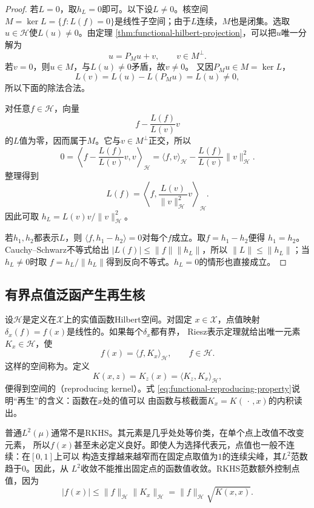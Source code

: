 \begin{proof}
若$L=0$，取$h_L=0$即可。以下设$L\neq0$。核空间
$M=\ker L=\{f:L(f)=0\}$是线性子空间；由于$L$连续，$M$也是闭集。选取
$u\in\mathcal{H}$使$L(u)\neq0$。由定理
\ref{thm:functional-hilbert-projection}，可以把$u$唯一分解为
\[
  u=P_Mu+v,\qquad v\in M^\perp.
\]
若$v=0$，则$u\in M$，与$L(u)\neq0$矛盾，故$v\neq0$。
又因$P_Mu\in M=\ker L$，
\[
  L(v)=L(u)-L(P_Mu)=L(u)\neq0,
\]
所以下面的除法合法。

对任意$f\in\mathcal{H}$，向量
\[
  f-\frac{L(f)}{L(v)}v
\]
的$L$值为零，因而属于$M$。它与$v\in M^\perp$正交，所以
\[
  0
  =
  \left\langle
    f-\frac{L(f)}{L(v)}v,v
  \right\rangle_{\mathcal{H}}
  =
  \langle f,v\rangle_{\mathcal{H}}
  -
  \frac{L(f)}{L(v)}\lVert v\rVert_{\mathcal{H}}^2.
\]
整理得到
\[
  L(f)
  =
  \left\langle
    f,\frac{L(v)}{\lVert v\rVert_{\mathcal{H}}^2}v
  \right\rangle_{\mathcal{H}}.
\]
因此可取
$h_L=L(v)v/\lVert v\rVert_{\mathcal{H}}^2$。

若$h_1,h_2$都表示$L$，则
$\langle f,h_1-h_2\rangle=0$对每个$f$成立。取$f=h_1-h_2$便得
$h_1=h_2$。Cauchy--Schwarz不等式给出
$|L(f)|\leq\lVert f\rVert\lVert h_L\rVert$，所以
$\lVert L\rVert\leq\lVert h_L\rVert$；当$h_L\neq0$时取
$f=h_L/\lVert h_L\rVert$得到反向不等式。$h_L=0$的情形也直接成立。
\end{proof}

\subsection{有界点值泛函产生再生核}

设$\mathcal{H}$是定义在$\mathcal{X}$上的实值函数Hilbert空间。对固定
$x\in\mathcal{X}$，点值映射$\delta_x(f)=f(x)$是线性的。如果每个$\delta_x$都有界，
Riesz表示定理就给出唯一元素$K_x\in\mathcal{H}$，使
\begin{equation}
  f(x)=\langle f,K_x\rangle_{\mathcal{H}},
  \qquad f\in\mathcal{H}.
  \label{eq:functional-reproducing-property}
\end{equation}
这样的空间称为。定义
\[
  K(x,z)=K_z(x)
  =\langle K_z,K_x\rangle_{\mathcal{H}},
\]
便得到空间的（reproducing kernel）。式
\eqref{eq:functional-reproducing-property}说明“再生”的含义：函数在$x$处的值可以
由函数与核截面$K_x=K(\,\cdot\,,x)$的内积读出。

普通$L^2(\mu)$通常不是RKHS。其元素是几乎处处等价类，在单个点上改值不改变元素，
所以$f(x)$甚至未必定义良好。即使人为选择代表元，点值也一般不连续：在$[0,1]$上可以
构造支撑越来越窄而在固定点取值为$1$的连续尖峰，其$L^2$范数趋于$0$。因此，从
$L^2$收敛不能推出固定点的函数值收敛。RKHS范数额外控制点值，因为
\begin{equation}
  |f(x)|
  \leq
  \lVert f\rVert_{\mathcal{H}}
  \lVert K_x\rVert_{\mathcal{H}}
  =
  \lVert f\rVert_{\mathcal{H}}\sqrt{K(x,x)}.
  \label{eq:functional-rkhs-pointwise-bound}
\end{equation}

